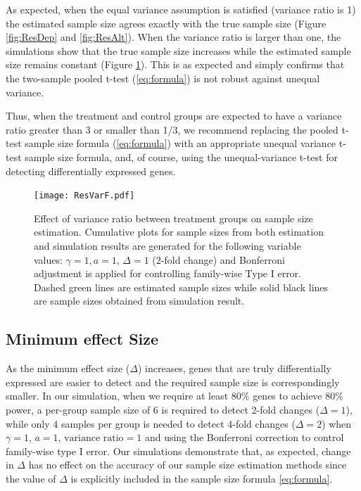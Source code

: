 \documentclass[12pt]{article}
\begin{document}
As expected, when the equal variance assumption is satisfied
(variance ratio is 1) the estimated sample size agrees exactly
with the true sample size (Figure \ref{fig:ResDep} and
\ref{fig:ResAlt}). When the variance ratio is larger than
one, the simulations show that the true sample size increases
while the estimated sample size remains constant (Figure
\ref{fig:ResVar}).   This is as expected and simply confirms that
the two-sample pooled t-test (\ref{eq:formula}) is not robust
against unequal variance.

Thus, when the treatment and control groups are expected to have a
variance ratio greater than 3 or smaller than 1/3, we recommend
replacing the pooled t-test sample size formula (\ref{eq:formula})
with an appropriate unequal variance t-test sample size formula,
and, of course, using the unequal-variance t-test for detecting
differentially expressed genes.

\begin{figure}%
  \caption[Effect of variance ratio between treatment groups on
    sample size estimation] {Effect of variance ratio between
    treatment groups on sample size estimation.  Cumulative plots for
    sample sizes from both estimation and simulation results are
    generated for the following variable values: $\gamma = 1, a = 1$,
    $\Delta = 1$ (2-fold change) and Bonferroni adjustment is applied for
    controlling family-wise Type I error. Dashed green lines are
    estimated sample sizes while solid black lines are sample
    sizes obtained from simulation result.}
  \label{fig:ResVar}
  \centerline{\texttt{[image: ResVarF.pdf]}}
\end{figure}

\subsection{Minimum effect Size}

As the minimum effect size ($\Delta$) increases, genes that are
truly differentially expressed are easier to detect and the
required sample size is correspondingly smaller.  In our
simulation, when we require at least 80\% genes to achieve 80\%
power, a per-group sample size of 6 is required to detect 2-fold
changes ($\Delta = 1$), while only 4 samples per group is needed
to detect 4-fold changes ($\Delta = 2$) when $\gamma=1$, $a=1$,
$\text{variance ratio}=1$ and using the Bonferroni correction to
control family-wise type I error. Our simulations demonstrate
that, as expected, change in $\Delta$ has no effect on the
accuracy of our sample size estimation methods since the value of
$\Delta$ is explicitly included in the sample size formula
\ref{eq:formula}.
\end{document}
